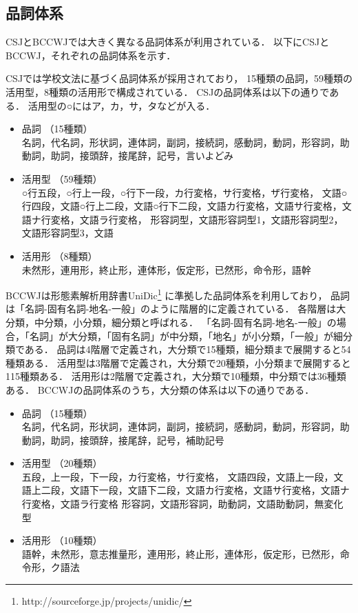 \documentclass[japanese]{jnlp_1.4}
\begin{document}
\subsection{品詞体系}
\label{pos_tagset_diff}

CSJとBCCWJでは大きく異なる品詞体系が利用されている．
以下にCSJとBCCWJ，それぞれの品詞体系を示す．


CSJでは学校文法に基づく品詞体系が採用されており，
15種類の品詞，59種類の活用型，8種類の活用形で構成されている\cite{ogura2004}．
CSJの品詞体系は以下の通りである．
活用型の○にはア，カ，サ，タなどが入る．

\begin{itemize}
\item 品詞 （15種類）\\
名詞，代名詞，形状詞，連体詞，副詞，接続詞，感動詞，動詞，形容詞，助動詞，助詞，接頭辞，接尾辞，記号，言いよどみ
\item 活用型 （59種類）\\
○行五段，○行上一段，○行下一段，カ行変格，サ行変格，ザ行変格，
文語○行四段，文語○行上二段，文語○行下二段，文語カ行変格，文語サ行変格，文語ナ行変格，文語ラ行変格，
形容詞型，文語形容詞型1，文語形容詞型2，文語形容詞型3，文語
\item 活用形 （8種類） \\
未然形，連用形，終止形，連体形，仮定形，已然形，命令形，語幹
\end{itemize}

BCCWJは形態素解析用辞書UniDic\cite{den2007}\footnote{http://sourceforge.jp/projects/unidic/}
に準拠した品詞体系を利用しており，
品詞は「名詞-固有名詞-地名-一般」のように階層的に定義されている．
各階層は大分類，中分類，小分類，細分類と呼ばれる．
「名詞-固有名詞-地名-一般」の場合，「名詞」が大分類，「固有名詞」が中分類，「地名」が小分類，「一般」が細分類である．
品詞は4階層で定義され，大分類で15種類，細分類まで展開すると54種類ある．
活用型は3階層で定義され，大分類で20種類，小分類まで展開すると115種類ある．
活用形は2階層で定義され，大分類で10種類，中分類では36種類ある．
BCCWJの品詞体系のうち，大分類の体系は以下の通りである．

\begin{itemize}
\item 品詞 （15種類）\\
名詞，代名詞，形状詞，連体詞，副詞，接続詞，感動詞，動詞，形容詞，助動詞，助詞，接頭辞，接尾辞，記号，補助記号
\item 活用型 （20種類）\\
五段，上一段，下一段，カ行変格，サ行変格，
文語四段，文語上一段，文語上二段，文語下一段，文語下二段，文語カ行変格，文語サ行変格，文語ナ行変格，文語ラ行変格
形容詞，文語形容詞，助動詞，文語助動詞，無変化型
\item 活用形 （10種類）\\
語幹，未然形，意志推量形，連用形，終止形，連体形，仮定形，已然形，命令形，ク語法
\end{itemize}
\end{document}
